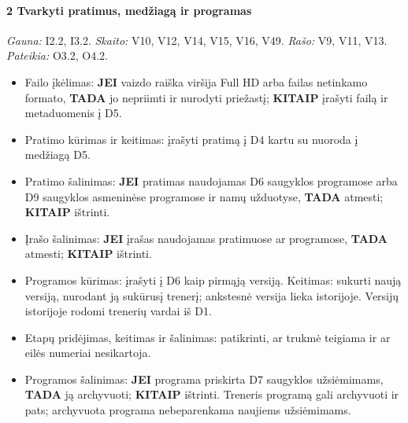 \paragraph{2 Tvarkyti pratimus, medžiagą ir programas}\mbox{}\par
{\small \textit{Gauna:} I2.2, I3.2. \textit{Skaito:} V10, V12, V14, V15, V16, V49. \textit{Rašo:} V9, V11, V13. \textit{Pateikia:} O3.2, O4.2.}
\begin{itemize}
  \item Failo įkėlimas: \textbf{JEI} vaizdo raiška viršija Full HD arba failas netinkamo formato, \textbf{TADA} jo nepriimti ir nurodyti priežastį; \textbf{KITAIP} įrašyti failą ir metaduomenis į D5.
  \item Pratimo kūrimas ir keitimas: įrašyti pratimą į D4 kartu su nuoroda į medžiagą D5.
  \item Pratimo šalinimas: \textbf{JEI} pratimas naudojamas D6 saugyklos programose arba D9 saugyklos asmeninėse programose ir namų užduotyse, \textbf{TADA} atmesti; \textbf{KITAIP} ištrinti.
  \item Įrašo šalinimas: \textbf{JEI} įrašas naudojamas pratimuose ar programose, \textbf{TADA} atmesti; \textbf{KITAIP} ištrinti.
  \item Programos kūrimas: įrašyti į D6 kaip pirmąją versiją. Keitimas: sukurti naują versiją, nurodant ją sukūrusį trenerį; ankstesnė versija lieka istorijoje. Versijų istorijoje rodomi trenerių vardai iš D1.
  \item Etapų pridėjimas, keitimas ir šalinimas: patikrinti, ar trukmė teigiama ir ar eilės numeriai nesikartoja.
  \item Programos šalinimas: \textbf{JEI} programa priskirta D7 saugyklos užsiėmimams, \textbf{TADA} ją archyvuoti; \textbf{KITAIP} ištrinti. Treneris programą gali archyvuoti ir pats; archyvuota programa nebeparenkama naujiems užsiėmimams.
\end{itemize}
